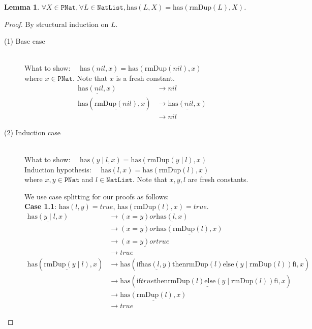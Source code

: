 \documentclass[12pt, a4paper]{article}
\newtheorem{lemma}[theorem]{Lemma}
\newcommand{\rel}[1]{\mathrel{#1}}
\newcommand{\rmx}[1]{\mathrm{#1}}
\newcommand{\larrow}{\longrightarrow}
\newcommand{\under}{\underline}
\begin{document}
\begin{lemma}
\label{lm1}
$\forall X \in \mathtt{PNat}, \forall L \in \mathtt{NatList}, \rmx{has}(L, X) = \rmx{has}(\rmx{rmDup}(L), X)$.
\end{lemma}
\begin{proof}
By structural induction on $L$.
\begin{description}
\item[(1) Base case]~\\
\noindent
What to show: $\quad \rmx{has}(nil, x) = \rmx{has}(\rmx{rmDup}(nil), x)$ \\
where $x \in \mathtt{PNat}$. Note that $x$ is a fresh constant.
\begin{align*}
\under{\rmx{has}(nil, x)}
	&\larrow nil \tag{by has1} \\
\rmx{has}(\under{\rmx{rmDup}(nil)}, x)
	&\larrow \under{\rmx{has}(nil, x)} \tag{by rmDup1} \\
	&\larrow nil \tag{by has1}
\end{align*}

\item[(2) Induction case]~\\
What to show: $\quad \rmx{has}(y \mid l, x) = \rmx{has}(\rmx{rmDup}(y \mid l), x)$ \\
Induction hypothesis: $\quad \rmx{has}(l, x) = \rmx{has}(\rmx{rmDup}(l), x)$  \\
where $x, y \in \mathtt{PNat}$ and $l \in \mathtt{NatList}$.
Note that $x, y, l$ are fresh constants.

We use case splitting for our proofs as follows: \\
\textbf{Case 1.1}: $\rmx{has}(l, y) = true$, $\rmx{has}(\rmx{rmDup}(l), x) = true$.
\begin{align*}
\under{\rmx{has}(y \mid l, x)}
	&\larrow (x = y) \rel{or} \under{\rmx{has}(l, x)} \tag{by has2} \\
	&\larrow (x = y) \rel{or} \under{\rmx{has}(\rmx{rmDup}(l), x)} \tag{by IH} \\
	&\larrow \under{(x = y) \rel{or} true} \tag{by case splitting} \\
	&\larrow true \tag{by or} \\
\rmx{has}(\under{\rmx{rmDup}(y \mid l)}, x)
	&\larrow \rmx{has}(\rel{\rmx{if}} \under{\rmx{has}(l, y)} \rel{\rmx{then}} \rmx{rmDup}(l) \rel{\rmx{else}} (y \mid \rmx{rmDup}(l)) \rel{\rmx{fi}}, x) \tag{by rmDup2} \\
	&\larrow \rmx{has}(\under{\rel{\rmx{if}} true \rel{\rmx{then}} \rmx{rmDup}(l) \rel{\rmx{else}} (y \mid \rmx{rmDup}(l)) \rel{\rmx{fi}}}, x) \tag{by case splitting} \\
	&\larrow \under{\rmx{has}(\rmx{rmDup}(l), x)} \tag{by if1} \\
	&\larrow true \tag{by case splitting}
\end{align*}


\end{description}
\end{proof}
\end{document}
